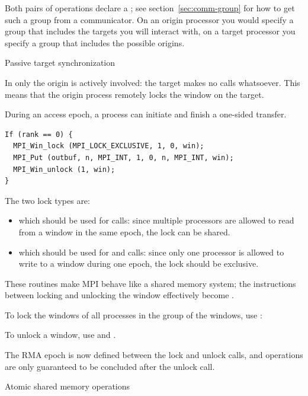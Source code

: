 Both pairs of operations declare a
; see section~\ref{sec:comm-group}
for how to get such a group from a communicator.
On an origin processor you would specify a group that includes the targets
you will interact with, on a target processor you specify a group
that includes the possible origins.

 {Passive target synchronization}
\label{sec:passive-sync}

In  only the origin is
actively involved: the target makes no calls whatsoever.
This means that the origin process remotely locks the window
on the target.

During an access epoch, a process can initiate and finish a one-sided
transfer.
\begin{verbatim}
If (rank == 0) {
  MPI_Win_lock (MPI_LOCK_EXCLUSIVE, 1, 0, win);
  MPI_Put (outbuf, n, MPI_INT, 1, 0, n, MPI_INT, win);
  MPI_Win_unlock (1, win);
}
\end{verbatim}
The two lock types are:
\begin{itemize}
\item {} which should be used for 
  calls: since multiple processors are allowed to read from a window
  in the same epoch, the lock can be shared.
\item {} which should be used for
   and  calls: since only one processor is
  allowed to write to a window during one epoch, the lock should be
  exclusive.
\end{itemize}
These routines make MPI behave like a shared memory system; the
instructions between locking and unlocking the window effectively
become .
%

To lock the windows of all processes in the group of the windows, use
:
%

To unlock a window, use  and
.

The RMA epoch is now defined between the lock and unlock calls, and
operations are only guaranteed to be concluded after the unlock call.

 {Atomic shared memory operations}

